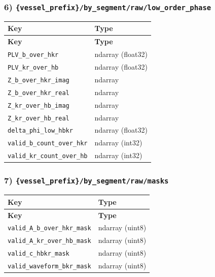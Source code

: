 \documentclass[11pt]{article}
\begin{document}
\subsubsection*{6) \texttt{\{vessel\_\allowbreak{}prefix\}/\allowbreak{}by\_\allowbreak{}segment/\allowbreak{}raw/\allowbreak{}low\_\allowbreak{}order\_\allowbreak{}phase}}
\begin{longtable}{|p{}|p{}|}
\hline
\textbf{Key} & \textbf{Type} \\ \hline
\endfirsthead
\hline
\textbf{Key} & \textbf{Type} \\ \hline
\endhead
\texttt{PLV\_\allowbreak{}b\_\allowbreak{}over\_\allowbreak{}hkr} & ndarray (float32) \\ \hline
\texttt{PLV\_\allowbreak{}kr\_\allowbreak{}over\_\allowbreak{}hb} & ndarray (float32) \\ \hline
\texttt{Z\_\allowbreak{}b\_\allowbreak{}over\_\allowbreak{}hkr\_\allowbreak{}imag} & ndarray \\ \hline
\texttt{Z\_\allowbreak{}b\_\allowbreak{}over\_\allowbreak{}hkr\_\allowbreak{}real} & ndarray \\ \hline
\texttt{Z\_\allowbreak{}kr\_\allowbreak{}over\_\allowbreak{}hb\_\allowbreak{}imag} & ndarray \\ \hline
\texttt{Z\_\allowbreak{}kr\_\allowbreak{}over\_\allowbreak{}hb\_\allowbreak{}real} & ndarray \\ \hline
\texttt{delta\_\allowbreak{}phi\_\allowbreak{}low\_\allowbreak{}hbkr} & ndarray (float32) \\ \hline
\texttt{valid\_\allowbreak{}b\_\allowbreak{}count\_\allowbreak{}over\_\allowbreak{}hkr} & ndarray (int32) \\ \hline
\texttt{valid\_\allowbreak{}kr\_\allowbreak{}count\_\allowbreak{}over\_\allowbreak{}hb} & ndarray (int32) \\ \hline
\end{longtable}

\subsubsection*{7) \texttt{\{vessel\_\allowbreak{}prefix\}/\allowbreak{}by\_\allowbreak{}segment/\allowbreak{}raw/\allowbreak{}masks}}
\begin{longtable}{|p{}|p{}|}
\hline
\textbf{Key} & \textbf{Type} \\ \hline
\endfirsthead
\hline
\textbf{Key} & \textbf{Type} \\ \hline
\endhead
\texttt{valid\_\allowbreak{}A\_\allowbreak{}b\_\allowbreak{}over\_\allowbreak{}hkr\_\allowbreak{}mask} & ndarray (uint8) \\ \hline
\texttt{valid\_\allowbreak{}A\_\allowbreak{}kr\_\allowbreak{}over\_\allowbreak{}hb\_\allowbreak{}mask} & ndarray (uint8) \\ \hline
\texttt{valid\_\allowbreak{}c\_\allowbreak{}hbkr\_\allowbreak{}mask} & ndarray (uint8) \\ \hline
\texttt{valid\_\allowbreak{}waveform\_\allowbreak{}bkr\_\allowbreak{}mask} & ndarray (uint8) \\ \hline
\end{longtable}
\end{document}
